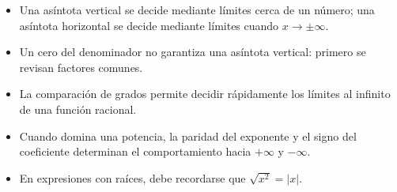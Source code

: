 \documentclass[10pt,a5paper]{article}
\begin{document}
\begin{nota}
\begin{itemize}
  \item Una asíntota vertical se decide mediante límites cerca de un número; una asíntota horizontal se decide mediante límites cuando $x\to\pm\infty$.
  \item Un cero del denominador no garantiza una asíntota vertical: primero se revisan factores comunes.
  \item La comparación de grados permite decidir rápidamente los límites al infinito de una función racional.
  \item Cuando domina una potencia, la paridad del exponente y el signo del coeficiente determinan el comportamiento hacia $+\infty$ y $-\infty$.
  \item En expresiones con raíces, debe recordarse que $\sqrt{x^2}=|x|$.
\end{itemize}
\end{nota}

\end{document}

